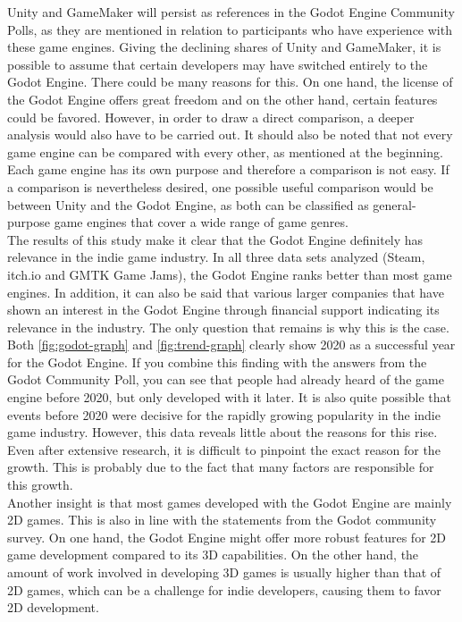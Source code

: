 Unity and GameMaker will persist as references in the Godot Engine Community Polls, as they are mentioned in relation to participants who have experience with these game engines.
Giving the declining shares of Unity and GameMaker, it is possible to assume that certain developers may have switched entirely to the Godot Engine.
There could be many reasons for this.
On one hand, the license of the Godot Engine offers great freedom and on the other hand, certain features could be favored.
However, in order to draw a direct comparison, a deeper analysis would also have to be carried out.
It should also be noted that not every game engine can be compared with every other, as mentioned at the beginning.
Each game engine has its own purpose and therefore a comparison is not easy.
If a comparison is nevertheless desired, one possible useful comparison would be between Unity and the Godot Engine, as both can be classified as general-purpose game engines that cover a wide range of game genres.\\

The results of this study make it clear that the Godot Engine definitely has relevance in the indie game industry.
In all three data sets analyzed (Steam, itch.io and GMTK Game Jams), the Godot Engine ranks better than most game engines.
In addition, it can also be said that various larger companies that have shown an interest in the Godot Engine through financial support indicating its relevance in the industry. 
The only question that remains is why this is the case.
Both \autoref{fig:godot-graph} and \autoref{fig:trend-graph} clearly show 2020 as a successful year for the Godot Engine.
If you combine this finding with the answers from the Godot Community Poll, you can see that people had already heard of the game engine before 2020, but only developed with it later.
It is also quite possible that events before 2020 were decisive for the rapidly growing popularity in the indie game industry.
However, this data reveals little about the reasons for this rise. Even after extensive research, it is difficult to pinpoint the exact reason for the growth.
This is probably due to the fact that many factors are responsible for this growth. \\

Another insight is that most games developed with the Godot Engine are mainly 2D games.
This is also in line with the statements from the Godot community survey.
On one hand, the Godot Engine might offer more robust features for 2D game development compared to its 3D capabilities.
On the other hand, the amount of work involved in developing 3D games is usually higher than that of 2D games, which can be a challenge for indie developers, causing them to favor 2D development. \\

